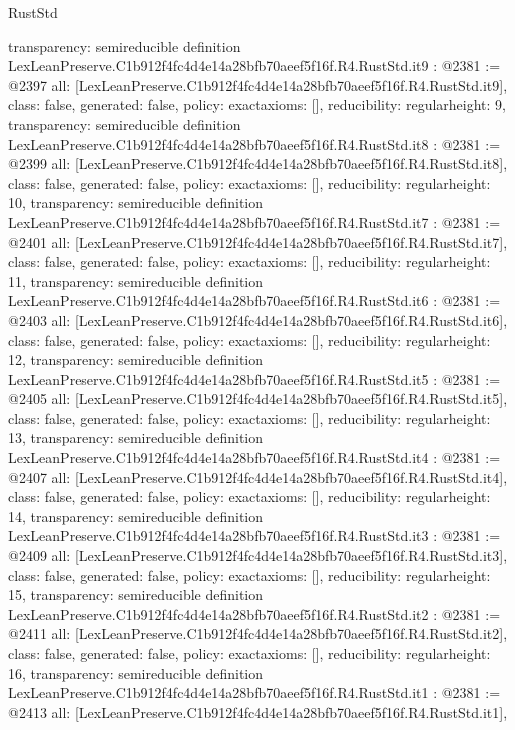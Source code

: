 \begin{lexlean}{RustStd}
\begin{coremodule}
{  transparency: semireducible
}
definition LexLeanPreserve.C1b912f4fc4d4e14a28bfb70aeef5f16f.R4.RustStd.it9 : @2381 := @2397 {
  all: [LexLeanPreserve.C1b912f4fc4d4e14a28bfb70aeef5f16f.R4.RustStd.it9],
  class: false,
  generated: false,
  policy: exact{axioms: []},
  reducibility: regular{height: 9},
  transparency: semireducible
}
definition LexLeanPreserve.C1b912f4fc4d4e14a28bfb70aeef5f16f.R4.RustStd.it8 : @2381 := @2399 {
  all: [LexLeanPreserve.C1b912f4fc4d4e14a28bfb70aeef5f16f.R4.RustStd.it8],
  class: false,
  generated: false,
  policy: exact{axioms: []},
  reducibility: regular{height: 10},
  transparency: semireducible
}
definition LexLeanPreserve.C1b912f4fc4d4e14a28bfb70aeef5f16f.R4.RustStd.it7 : @2381 := @2401 {
  all: [LexLeanPreserve.C1b912f4fc4d4e14a28bfb70aeef5f16f.R4.RustStd.it7],
  class: false,
  generated: false,
  policy: exact{axioms: []},
  reducibility: regular{height: 11},
  transparency: semireducible
}
definition LexLeanPreserve.C1b912f4fc4d4e14a28bfb70aeef5f16f.R4.RustStd.it6 : @2381 := @2403 {
  all: [LexLeanPreserve.C1b912f4fc4d4e14a28bfb70aeef5f16f.R4.RustStd.it6],
  class: false,
  generated: false,
  policy: exact{axioms: []},
  reducibility: regular{height: 12},
  transparency: semireducible
}
definition LexLeanPreserve.C1b912f4fc4d4e14a28bfb70aeef5f16f.R4.RustStd.it5 : @2381 := @2405 {
  all: [LexLeanPreserve.C1b912f4fc4d4e14a28bfb70aeef5f16f.R4.RustStd.it5],
  class: false,
  generated: false,
  policy: exact{axioms: []},
  reducibility: regular{height: 13},
  transparency: semireducible
}
definition LexLeanPreserve.C1b912f4fc4d4e14a28bfb70aeef5f16f.R4.RustStd.it4 : @2381 := @2407 {
  all: [LexLeanPreserve.C1b912f4fc4d4e14a28bfb70aeef5f16f.R4.RustStd.it4],
  class: false,
  generated: false,
  policy: exact{axioms: []},
  reducibility: regular{height: 14},
  transparency: semireducible
}
definition LexLeanPreserve.C1b912f4fc4d4e14a28bfb70aeef5f16f.R4.RustStd.it3 : @2381 := @2409 {
  all: [LexLeanPreserve.C1b912f4fc4d4e14a28bfb70aeef5f16f.R4.RustStd.it3],
  class: false,
  generated: false,
  policy: exact{axioms: []},
  reducibility: regular{height: 15},
  transparency: semireducible
}
definition LexLeanPreserve.C1b912f4fc4d4e14a28bfb70aeef5f16f.R4.RustStd.it2 : @2381 := @2411 {
  all: [LexLeanPreserve.C1b912f4fc4d4e14a28bfb70aeef5f16f.R4.RustStd.it2],
  class: false,
  generated: false,
  policy: exact{axioms: []},
  reducibility: regular{height: 16},
  transparency: semireducible
}
definition LexLeanPreserve.C1b912f4fc4d4e14a28bfb70aeef5f16f.R4.RustStd.it1 : @2381 := @2413 {
  all: [LexLeanPreserve.C1b912f4fc4d4e14a28bfb70aeef5f16f.R4.RustStd.it1],
}
\end{coremodule}
\end{lexlean}
